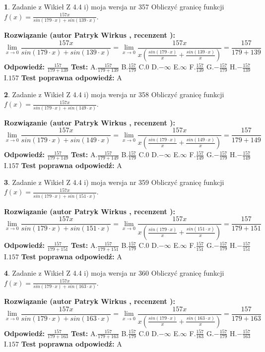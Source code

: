 \documentclass[12pt, a4paper]{article}
\theoremstyle{definition} %
\newtheorem{zad}{}
\newcommand{\zadStart}[1]{\begin{zad}#1\newline}
\newcommand{\zadStop}{\end{zad}}
\newcommand{\rozwStart}[2]{\noindent \textbf{Rozwiązanie (autor #1 , recenzent #2): }\newline}
\newcommand{\rozwStop}{\newline}
\newcommand{\odpStart}{\noindent \textbf{Odpowiedź:}\newline}
\newcommand{\odpStop}{\newline}
\newcommand{\testStart}{\noindent \textbf{Test:}\newline}
\newcommand{\testStop}{\newline}
\newcommand{\kluczStart}{\noindent \textbf{Test poprawna odpowiedź:}\newline}
\newcommand{\kluczStop}{\newline}
\begin{document}
\zadStart{Zadanie z Wikieł Z 4.4 i) moja wersja nr 357}
Obliczyć granicę funkcji $f(x)=\frac{157x}{sin(179\cdot x) +sin(139\cdot x)}$.
\zadStop
\rozwStart{Patryk Wirkus}{}
$$\lim\limits_{x\to 0}\frac{157x}{sin(179\cdot x) +sin(139\cdot x)}=\lim\limits_{x\to 0}\frac{157x}{x(\frac{sin(179\cdot x)}{x}+\frac{sin(139\cdot x)}{x})}=\frac{157}{179+139}$$
\rozwStop
\odpStart
$\frac{157}{179+139}$
\odpStop
\testStart
A.$\frac{157}{179+139}$
B.$\frac{157}{179}$
C.$0$
D.$-\infty$
E.$\infty$
F.$\frac{157}{139}$
G.$-\frac{157}{179}$
H.$-\frac{157}{139}$
I.$157$
\testStop
\kluczStart
A
\kluczStop



\zadStart{Zadanie z Wikieł Z 4.4 i) moja wersja nr 358}
Obliczyć granicę funkcji $f(x)=\frac{157x}{sin(179\cdot x) +sin(149\cdot x)}$.
\zadStop
\rozwStart{Patryk Wirkus}{}
$$\lim\limits_{x\to 0}\frac{157x}{sin(179\cdot x) +sin(149\cdot x)}=\lim\limits_{x\to 0}\frac{157x}{x(\frac{sin(179\cdot x)}{x}+\frac{sin(149\cdot x)}{x})}=\frac{157}{179+149}$$
\rozwStop
\odpStart
$\frac{157}{179+149}$
\odpStop
\testStart
A.$\frac{157}{179+149}$
B.$\frac{157}{179}$
C.$0$
D.$-\infty$
E.$\infty$
F.$\frac{157}{149}$
G.$-\frac{157}{179}$
H.$-\frac{157}{149}$
I.$157$
\testStop
\kluczStart
A
\kluczStop



\zadStart{Zadanie z Wikieł Z 4.4 i) moja wersja nr 359}
Obliczyć granicę funkcji $f(x)=\frac{157x}{sin(179\cdot x) +sin(151\cdot x)}$.
\zadStop
\rozwStart{Patryk Wirkus}{}
$$\lim\limits_{x\to 0}\frac{157x}{sin(179\cdot x) +sin(151\cdot x)}=\lim\limits_{x\to 0}\frac{157x}{x(\frac{sin(179\cdot x)}{x}+\frac{sin(151\cdot x)}{x})}=\frac{157}{179+151}$$
\rozwStop
\odpStart
$\frac{157}{179+151}$
\odpStop
\testStart
A.$\frac{157}{179+151}$
B.$\frac{157}{179}$
C.$0$
D.$-\infty$
E.$\infty$
F.$\frac{157}{151}$
G.$-\frac{157}{179}$
H.$-\frac{157}{151}$
I.$157$
\testStop
\kluczStart
A
\kluczStop



\zadStart{Zadanie z Wikieł Z 4.4 i) moja wersja nr 360}
Obliczyć granicę funkcji $f(x)=\frac{157x}{sin(179\cdot x) +sin(163\cdot x)}$.
\zadStop
\rozwStart{Patryk Wirkus}{}
$$\lim\limits_{x\to 0}\frac{157x}{sin(179\cdot x) +sin(163\cdot x)}=\lim\limits_{x\to 0}\frac{157x}{x(\frac{sin(179\cdot x)}{x}+\frac{sin(163\cdot x)}{x})}=\frac{157}{179+163}$$
\rozwStop
\odpStart
$\frac{157}{179+163}$
\odpStop
\testStart
A.$\frac{157}{179+163}$
B.$\frac{157}{179}$
C.$0$
D.$-\infty$
E.$\infty$
F.$\frac{157}{163}$
G.$-\frac{157}{179}$
H.$-\frac{157}{163}$
I.$157$
\testStop
\kluczStart
A
\kluczStop
\end{document}
